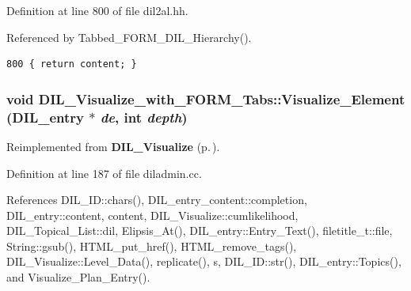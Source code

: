 Definition at line 800 of file dil2al.hh.

Referenced by Tabbed\_\-FORM\_\-DIL\_\-Hierarchy().



\footnotesize\begin{verbatim}800 { return content; }
\end{verbatim}\normalsize 
{}
\subsubsection{\setlength{\rightskip}{0pt plus 5cm}void DIL\_\-Visualize\_\-with\_\-FORM\_\-Tabs::Visualize\_\-Element ({\bf DIL\_\-entry} $\ast$ {\em de}, int {\em depth})\hspace{0.3cm}{\tt  [virtual]}}\label{classDIL__Visualize__with__FORM__Tabs_a2}




Reimplemented from {\bf DIL\_\-Visualize} {\rm (p.\,\pageref{classDIL__Visualize_a5})}.

Definition at line 187 of file diladmin.cc.

References DIL\_\-ID::chars(), DIL\_\-entry\_\-content::completion, DIL\_\-entry::content, content, DIL\_\-Visualize::cumlikelihood, DIL\_\-Topical\_\-List::dil, Elipsis\_\-At(), DIL\_\-entry::Entry\_\-Text(), filetitle\_\-t::file, String::gsub(), HTML\_\-put\_\-href(), HTML\_\-remove\_\-tags(), DIL\_\-Visualize::Level\_\-Data(), replicate(), s, DIL\_\-ID::str(), DIL\_\-entry::Topics(), and Visualize\_\-Plan\_\-Entry().



